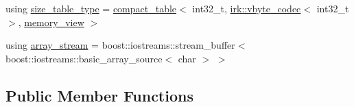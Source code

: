 \begin{DoxyCompactItemize}
\item 
using \mbox{\hyperlink{classirk_1_1basic__inverted__index__view_a55dabda525be5920c6faeaa009c2c918}{size\+\_\+table\+\_\+type}} = \mbox{\hyperlink{classirk_1_1compact__table}{compact\+\_\+table}}$<$ int32\+\_\+t, \mbox{\hyperlink{structirk_1_1vbyte__codec}{irk\+::vbyte\+\_\+codec}}$<$ int32\+\_\+t $>$, \mbox{\hyperlink{classirk_1_1memory__view}{memory\+\_\+view}} $>$
\item 
using \mbox{\hyperlink{classirk_1_1basic__inverted__index__view_ac50afe9fc376318d6a2034e3fa36a59f}{array\+\_\+stream}} = boost\+::iostreams\+::stream\+\_\+buffer$<$ boost\+::iostreams\+::basic\+\_\+array\+\_\+source$<$ char $>$ $>$
\end{DoxyCompactItemize}
\subsection*{Public Member Functions}
